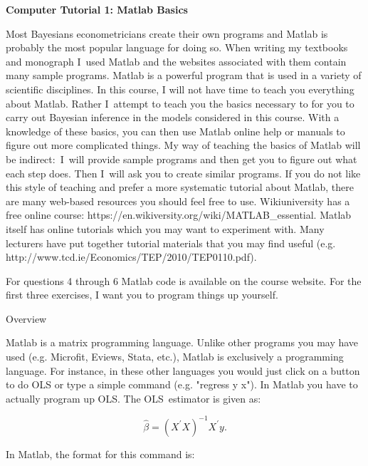 \documentclass{article}
\begin{document}
\begin{center}
\bigskip

\textbf{Computer Tutorial 1: Matlab Basics}
\end{center}

\bigskip

Most Bayesians econometricians create their own programs and Matlab is
probably the most popular language for doing so. When writing my textbooks
and monograph I\ used Matlab and the websites associated with them contain
many sample programs. Matlab is a powerful program that is used in a variety
of scientific disciplines. In this course, I will not have time to teach you
everything about Matlab. Rather I\ attempt to teach you the basics necessary
to for you to carry out Bayesian inference in the models considered in this
course. With a knowledge of these basics, you can then use Matlab online
help or manuals to figure out more complicated things. My way of teaching
the basics of Matlab will be indirect:\ I\ will provide sample programs and
then get you to figure out what each step does. Then I\ will ask you to
create similar programs. If you do not like this style of teaching and
prefer a more systematic tutorial about Matlab, there are many web-based
resources you should feel free to use. Wikiuniversity has a free online
course: https://en.wikiversity.org/wiki/MATLAB\_essential. Matlab itself has
online tutorials which you may want to experiment with. Many lecturers have
put together tutorial materials that you may find useful (e.g.
http://www.tcd.ie/Economics/TEP/2010/TEP0110.pdf).

For questions 4 through 6 Matlab code is available on the course website.
For the first three exercises, I want you to program things up yourself.

\bigskip

{\large Overview}

Matlab is a matrix programming language. Unlike other programs you may have
used (e.g. Microfit, Eviews, Stata, etc.), Matlab is exclusively a
programming language. For instance, in these other languages you would just
click on a button to do OLS or type a simple command (e.g. "regress y x").
In Matlab you have to actually program up OLS. The OLS\ estimator is given
as:

\begin{equation*}
\widehat{\beta }=\left( X^{\prime }X\right) ^{-1}X^{\prime }y.
\end{equation*}

In Matlab, the format for this command is:
\end{document}
